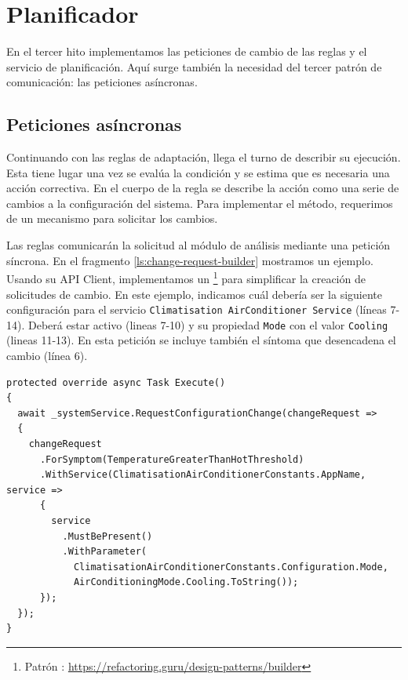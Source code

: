 \section{Planificador}

En el tercer hito implementamos las peticiones de cambio de las reglas y el servicio de planificación. Aquí surge también la necesidad del tercer patrón de comunicación: las peticiones asíncronas.

\subsection{Peticiones asíncronas}

Continuando con las reglas de adaptación, llega el turno de describir su ejecución. Esta tiene lugar una vez se evalúa la condición y se estima que es necesaria una acción correctiva. En el cuerpo de la regla se describe la acción como una serie de cambios a la configuración del sistema. Para implementar el método, requerimos de un mecanismo para solicitar los cambios.

Las reglas comunicarán la solicitud al módulo de análisis mediante una petición síncrona. En el fragmento \ref{ls:change-request-builder} mostramos un ejemplo. Usando su API Client, implementamos un \footnote{Patrón : \url{https://refactoring.guru/design-patterns/builder}} para simplificar la creación de solicitudes de cambio. En este ejemplo, indicamos cuál debería ser la siguiente configuración para el servicio \texttt{Climatisation AirConditioner Service} (líneas 7-14). Deberá estar activo (lineas 7-10) y su propiedad \texttt{Mode} con el valor \texttt{Cooling} (lineas 11-13). En esta petición se incluye también el síntoma que desencadena el cambio (línea 6).

\begin{lstlisting}[language={[Sharp]C},caption={Implementación de la misma petición siguiendo el patrón \emph{builder}.},captionpos=b, label=ls:change-request-builder]
protected override async Task Execute()
{
  await _systemService.RequestConfigurationChange(changeRequest =>
  {
    changeRequest
      .ForSymptom(TemperatureGreaterThanHotThreshold)
      .WithService(ClimatisationAirConditionerConstants.AppName, service =>
      {
        service
          .MustBePresent()
          .WithParameter(
            ClimatisationAirConditionerConstants.Configuration.Mode,
            AirConditioningMode.Cooling.ToString());
      });
  });
}
\end{lstlisting}

